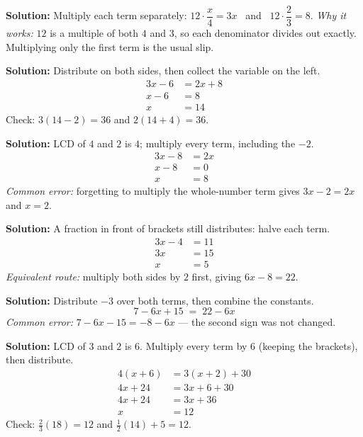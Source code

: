 \documentclass[12pt]{article}
\begin{document}
\textbf{Solution:} Multiply each term separately:
$12 \cdot \dfrac{x}{4} = 3x$ \ and \ $12 \cdot \dfrac{2}{3} = 8$.
\emph{Why it works:} $12$ is a multiple of both $4$ and $3$, so each denominator divides out
exactly. Multiplying only the first term is the usual slip.

\textbf{Solution:} Distribute on both sides, then collect the variable on the left.
\begin{align*}
3x - 6 &= 2x + 8 \\
x - 6 &= 8 \\
x &= 14
\end{align*}
Check: $3(14 - 2) = 36$ and $2(14 + 4) = 36$.

\textbf{Solution:} LCD of $4$ and $2$ is $4$; multiply every term, including the $-2$.
\begin{align*}
3x - 8 &= 2x \\
x - 8 &= 0 \\
x &= 8
\end{align*}
\emph{Common error:} forgetting to multiply the whole-number term gives $3x - 2 = 2x$ and $x = 2$.

\textbf{Solution:} A fraction in front of brackets still distributes: halve each term.
\begin{align*}
3x - 4 &= 11 \\
3x &= 15 \\
x &= 5
\end{align*}
\emph{Equivalent route:} multiply both sides by $2$ first, giving $6x - 8 = 22$.

\textbf{Solution:} Distribute $-3$ over both terms, then combine the constants.
\[ 7 - 6x + 15 \;=\; 22 - 6x \]
\emph{Common error:} $7 - 6x - 15 = -8 - 6x$ --- the second sign was not changed.

\textbf{Solution:} LCD of $3$ and $2$ is $6$. Multiply every term by $6$ (keeping the brackets),
then distribute.
\begin{align*}
4(x + 6) &= 3(x + 2) + 30 \\
4x + 24 &= 3x + 6 + 30 \\
4x + 24 &= 3x + 36 \\
x &= 12
\end{align*}
Check: $\tfrac{2}{3}(18) = 12$ and $\tfrac{1}{2}(14) + 5 = 12$.
\end{document}
